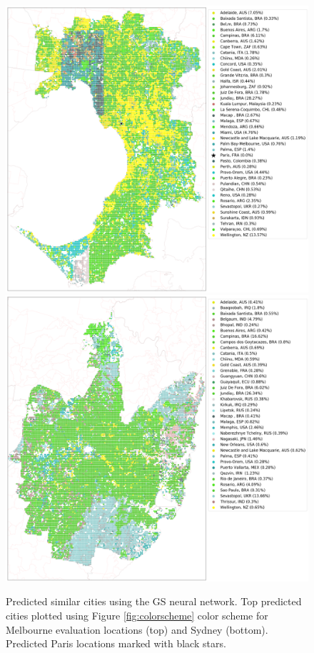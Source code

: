 \documentclass[sageh,times]{sagej}
\begin{document}
\begin{figure}[!htbp]
\centering    
\includegraphics[scale=0.16]{Images/MelbourneOverallAbrev_sat.png} 
\includegraphics[scale=0.16]{Images/SydneyOverallAbrev_sat.png}  
\caption{Predicted similar cities using the GS neural network. Top predicted cities plotted using Figure \ref{fig:colorscheme} color scheme for Melbourne evaluation locations (top) and Sydney (bottom). Predicted Paris locations marked with black stars.} 
 \label{fig:melsat}  
\end{figure} 
\end{document}

